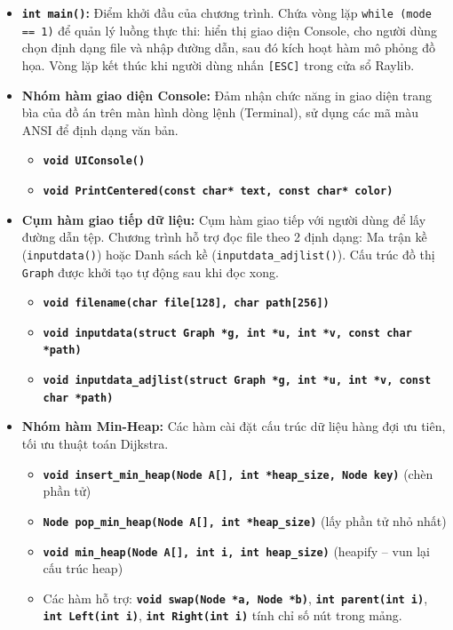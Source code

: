 \documentclass[12pt,a4paper,oneside]{report}
\begin{document}
\begin{itemize}
    \item \textbf{\texttt{int main()}:} Điểm khởi đầu của chương trình. Chứa vòng lặp \texttt{while (mode == 1)} để quản lý luồng thực thi: hiển thị giao diện Console, cho người dùng chọn định dạng file và nhập đường dẫn, sau đó kích hoạt hàm mô phỏng đồ họa. Vòng lặp kết thúc khi người dùng nhấn \texttt{[ESC]} trong cửa sổ Raylib.
    
    \item \textbf{Nhóm hàm giao diện Console:} Đảm nhận chức năng in giao diện trang bìa của đồ án trên màn hình dòng lệnh (Terminal), sử dụng các mã màu ANSI để định dạng văn bản.
    \begin{itemize}
        \item \textbf{\texttt{void UIConsole()}}
        \item \textbf{\texttt{void PrintCentered(const char* text, const char* color)}}
    \end{itemize}
    
    \item \textbf{Cụm hàm giao tiếp dữ liệu:} Cụm hàm giao tiếp với người dùng để lấy đường dẫn tệp. Chương trình hỗ trợ đọc file theo 2 định dạng: Ma trận kề (\texttt{inputdata()}) hoặc Danh sách kề (\texttt{inputdata\_adjlist()}). Cấu trúc đồ thị \texttt{Graph} được khởi tạo tự động sau khi đọc xong.
    \begin{itemize}
        \item \textbf{\texttt{void filename(char file[128], char path[256])}}
        \item \textbf{\texttt{void inputdata(struct Graph *g, int *u, int *v, const char *path)}}
        \item \textbf{\texttt{void inputdata\_adjlist(struct Graph *g, int *u, int *v, const char *path)}}
    \end{itemize}
    
    \item \textbf{Nhóm hàm Min-Heap:} Các hàm cài đặt cấu trúc dữ liệu hàng đợi ưu tiên, tối ưu thuật toán Dijkstra.
    \begin{itemize}
        \item \textbf{\texttt{void insert\_min\_heap(Node A[], int *heap\_size, Node key)}} (chèn phần tử)
        \item \textbf{\texttt{Node pop\_min\_heap(Node A[], int *heap\_size)}} (lấy phần tử nhỏ nhất)
        \item \textbf{\texttt{void min\_heap(Node A[], int i, int heap\_size)}} (heapify -- vun lại cấu trúc heap)
        \item Các hàm hỗ trợ: \textbf{\texttt{void swap(Node *a, Node *b)}}, \textbf{\texttt{int parent(int i)}}, \textbf{\texttt{int Left(int i)}}, \textbf{\texttt{int Right(int i)}} tính chỉ số nút trong mảng.
    \end{itemize}
    

\end{itemize}
\end{document}
